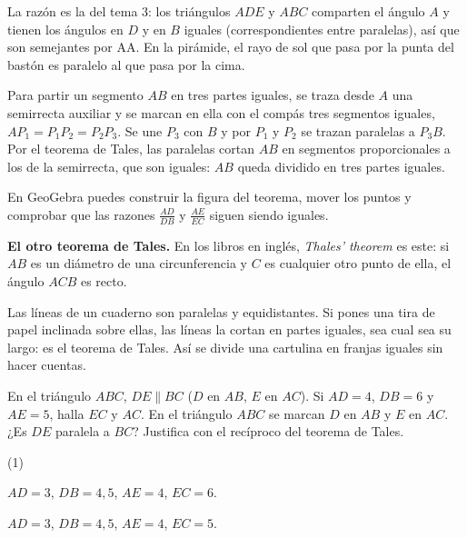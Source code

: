 \documentclass[11pt]{article}
\begin{document}
La razón es la del tema 3: los triángulos $ADE$ y $ABC$ comparten el ángulo
$A$ y tienen los ángulos en $D$ y en $B$ iguales (correspondientes entre
paralelas), así que son semejantes por AA. En la pirámide, el rayo de sol
que pasa por la punta del bastón es paralelo al que pasa por la cima.

\begin{ejemplo}
Para partir un segmento $AB$ en tres partes iguales, se traza desde $A$ una
semirrecta auxiliar y se marcan en ella con el compás tres segmentos
iguales, $AP_1 = P_1P_2 = P_2P_3$. Se une $P_3$ con $B$ y por $P_1$ y $P_2$
se trazan paralelas a $P_3B$. Por el teorema de Tales, las paralelas cortan
$AB$ en segmentos proporcionales a los de la semirrecta, que son iguales:
$AB$ queda dividido en tres partes iguales.
\end{ejemplo}

En GeoGebra puedes construir la figura del teorema, mover los puntos y
comprobar que las razones $\frac{AD}{DB}$ y $\frac{AE}{EC}$ siguen siendo
iguales.

\textbf{El otro teorema de Tales.} En los libros en inglés, \emph{Thales'
theorem} es este: si $AB$ es un diámetro de una circunferencia y $C$ es
cualquier otro punto de ella, el ángulo $ACB$ es recto.

\begin{aplicacion}
Las líneas de un cuaderno son paralelas y equidistantes. Si pones una tira
de papel inclinada sobre ellas, las líneas la cortan en partes iguales, sea
cual sea su largo: es el teorema de Tales. Así se divide una cartulina en
franjas iguales sin hacer cuentas.
\end{aplicacion}

\begin{preguntas}
\pregunta En el triángulo $ABC$, $DE \parallel BC$ ($D$ en $AB$, $E$ en
$AC$). Si $AD = 4$, $DB = 6$ y $AE = 5$, halla $EC$ y $AC$.
\espacio{2cm}
\pregunta En el triángulo $ABC$ se marcan $D$ en $AB$ y $E$ en $AC$. ¿Es
$DE$ paralela a $BC$? Justifica con el recíproco del teorema de Tales.
\begin{opciones*}(1)
  \item $AD = 3$, $DB = 4{,}5$, $AE = 4$, $EC = 6$.
  \item $AD = 3$, $DB = 4{,}5$, $AE = 4$, $EC = 5$.
\end{opciones*}
\espacio{2.5cm}
\end{preguntas}
\end{document}
